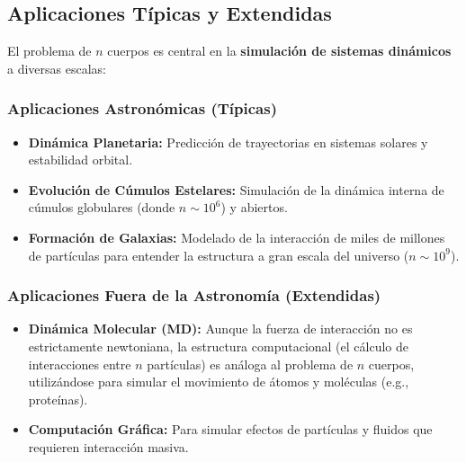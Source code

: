 \subsection{Aplicaciones Típicas y Extendidas}
\label{subsec:aplicaciones}

El problema de $n$ cuerpos es central en la \textbf{simulación de sistemas dinámicos} a diversas escalas:

\subsubsection*{Aplicaciones Astronómicas (Típicas)}
\begin{itemize}
    \item \textbf{Dinámica Planetaria:} Predicción de trayectorias en sistemas solares y estabilidad orbital.
    \item \textbf{Evolución de Cúmulos Estelares:} Simulación de la dinámica interna de cúmulos globulares (donde $n \sim 10^6$) y abiertos.
    \item \textbf{Formación de Galaxias:} Modelado de la interacción de miles de millones de partículas para entender la estructura a gran escala del universo ($n \sim 10^9$).
\end{itemize}

\subsubsection*{Aplicaciones Fuera de la Astronomía (Extendidas)}
\begin{itemize}
    \item \textbf{Dinámica Molecular (MD):} Aunque la fuerza de interacción no es estrictamente newtoniana, la estructura computacional (el cálculo de interacciones entre $n$ partículas) es análoga al problema de $n$ cuerpos, utilizándose para simular el movimiento de átomos y moléculas (e.g., proteínas).
    \item \textbf{Computación Gráfica:} Para simular efectos de partículas y fluidos que requieren interacción masiva.
\end{itemize}
